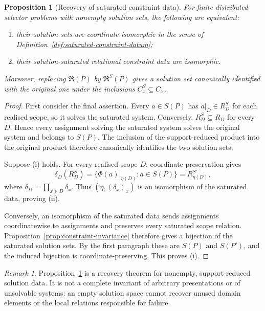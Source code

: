 \documentclass[11pt]{article}
\theoremstyle{plain}
\newtheorem{proposition}[theorem]{Proposition}
\theoremstyle{definition}
\theoremstyle{remark}
\newtheorem{remark}[theorem]{Remark}
\begin{document}
\begin{proposition}[Recovery of saturated constraint data]
\label{prop:saturated-completeness}
For finite distributed selector problems with nonempty solution sets, the
following are equivalent:
\begin{enumerate}[label=(\roman*)]
\item their solution sets are coordinate-isomorphic in the sense of
Definition~\ref{def:saturated-constraint-datum};
\item their solution-saturated relational constraint data are isomorphic.
\end{enumerate}
Moreover, replacing $\mathfrak R(P)$ by $\mathfrak R^{S}(P)$ gives a
solution set canonically identified with the original one under the inclusions
$C_x^S\subseteq C_x$.
\end{proposition}

\begin{proof}
First consider the final assertion. Every $a\in S(P)$ has
$a|_D\in R_D^{S}$ for each realised scope, so it solves the saturated system.
Conversely, $R_D^{S}\subseteq R_D$ for every $D$. Hence every assignment solving
the saturated system solves the original system and belongs to $S(P)$. The inclusion of the support-reduced product into
the original product therefore canonically identifies the two solution sets.

Suppose (i) holds. For every realised scope $D$, coordinate preservation gives
\[
\delta_D(R_D^{S})
=\{\Phi(a)|_{\eta(D)}:a\in S(P)\}
=R_{\eta(D)}^{S'},
\]
where $\delta_D=\prod_{x\in D}\delta_x$. Thus $(\eta,(\delta_x)_x)$ is an
isomorphism of the saturated data, proving (ii).

Conversely, an isomorphism of the saturated data sends assignments
coordinatewise to assignments and preserves every saturated scope relation.
Proposition~\ref{prop:constraint-invariance} therefore gives a bijection of the
saturated solution sets. By the first paragraph these are $S(P)$ and $S(P')$,
and the induced bijection is coordinate-preserving. This proves (i).
\end{proof}

\begin{remark}
Proposition~\ref{prop:saturated-completeness} is a recovery theorem for nonempty,
support-reduced solution data. It is not a complete invariant of arbitrary
presentations or of unsolvable systems: an empty solution space cannot recover
unused domain elements or the local relations responsible for failure.
\end{remark}
\end{document}
